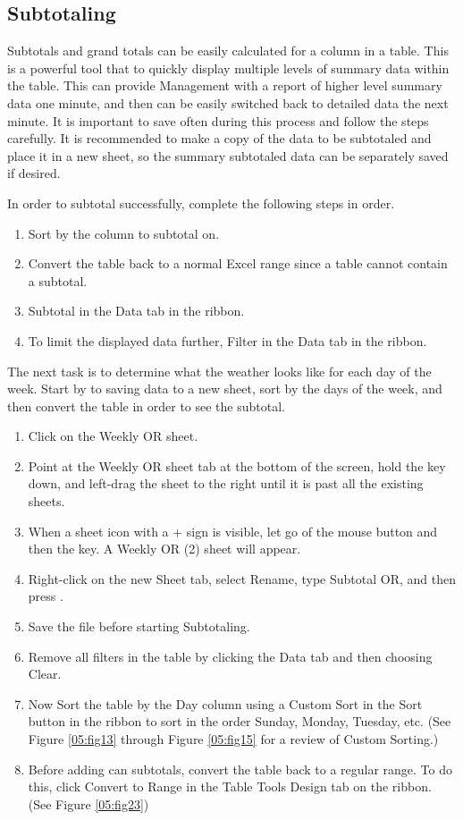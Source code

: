 \subsection{Subtotaling}

Subtotals and grand totals can be easily calculated for a column in a table. This is a powerful tool that to quickly display multiple levels of summary data within the table. This can provide Management with a report of higher level summary data one minute, and then can be easily switched back to detailed data the next minute. It is important to save often during this process and follow the steps carefully. It is recommended to make a copy of the data to be subtotaled and place it in a new sheet, so the summary subtotaled data can be separately saved if desired.

In order to subtotal successfully, complete the following steps in order.

\begin{enumerate}
	\item Sort by the column to subtotal on.
	\item Convert the table back to a normal Excel range since a table cannot contain a subtotal.
	\item Subtotal in the Data tab in the ribbon.
	\item To limit the displayed data further, Filter in the Data tab in the ribbon.
\end{enumerate}

The next task is to determine what the weather looks like for each day of the week. Start by to saving data to a new sheet, sort by the days of the week, and then convert the table in order to see the subtotal.

\begin{enumerate}
	\item Click on the Weekly OR sheet.
\item Point at the Weekly OR sheet tab at the bottom of the screen, hold the  key down, and left-drag the sheet to the right until it is past all the existing sheets.
\item When a sheet icon with a + sign is visible, let go of the mouse button and then the  key. A Weekly OR (2) sheet will appear.
\item Right-click on the new Sheet tab, select Rename, type Subtotal OR, and then press .
\item Save the file before starting Subtotaling.
\item Remove all filters in the table by clicking the Data tab and then choosing Clear.
\item Now Sort the table by the Day column using a Custom Sort in the Sort button in the ribbon to sort in the order Sunday, Monday, Tuesday, etc. (See Figure \ref{05:fig13} through Figure \ref{05:fig15} for a review of Custom Sorting.)
\item Before adding can subtotals, convert the table back to a regular range. To do this, click Convert to Range in the Table Tools Design tab on the ribbon. (See Figure \ref{05:fig23})
\end{enumerate}

